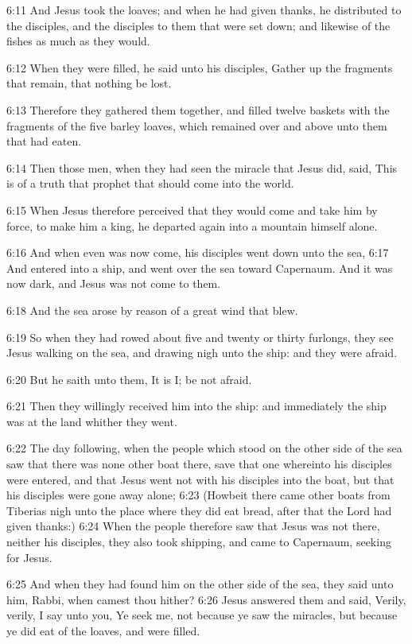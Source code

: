 6:11 And Jesus took the loaves; and when he had given thanks, he distributed to the disciples, and the disciples to them that were set down; and likewise of the fishes as much as they would.

6:12 When they were filled, he said unto his disciples, Gather up the fragments that remain, that nothing be lost.

6:13 Therefore they gathered them together, and filled twelve baskets with the fragments of the five barley loaves, which remained over and above unto them that had eaten.

6:14 Then those men, when they had seen the miracle that Jesus did, said, This is of a truth that prophet that should come into the world.

6:15 When Jesus therefore perceived that they would come and take him by force, to make him a king, he departed again into a mountain himself alone.

6:16 And when even was now come, his disciples went down unto the sea, 6:17 And entered into a ship, and went over the sea toward Capernaum.  And it was now dark, and Jesus was not come to them.

6:18 And the sea arose by reason of a great wind that blew.

6:19 So when they had rowed about five and twenty or thirty furlongs, they see Jesus walking on the sea, and drawing nigh unto the ship: and they were afraid.

6:20 But he saith unto them, It is I; be not afraid.

6:21 Then they willingly received him into the ship: and immediately the ship was at the land whither they went.

6:22 The day following, when the people which stood on the other side of the sea saw that there was none other boat there, save that one whereinto his disciples were entered, and that Jesus went not with his disciples into the boat, but that his disciples were gone away alone; 6:23 (Howbeit there came other boats from Tiberias nigh unto the place where they did eat bread, after that the Lord had given thanks:) 6:24 When the people therefore saw that Jesus was not there, neither his disciples, they also took shipping, and came to Capernaum, seeking for Jesus.

6:25 And when they had found him on the other side of the sea, they said unto him, Rabbi, when camest thou hither?  6:26 Jesus answered them and said, Verily, verily, I say unto you, Ye seek me, not because ye saw the miracles, but because ye did eat of the loaves, and were filled.

